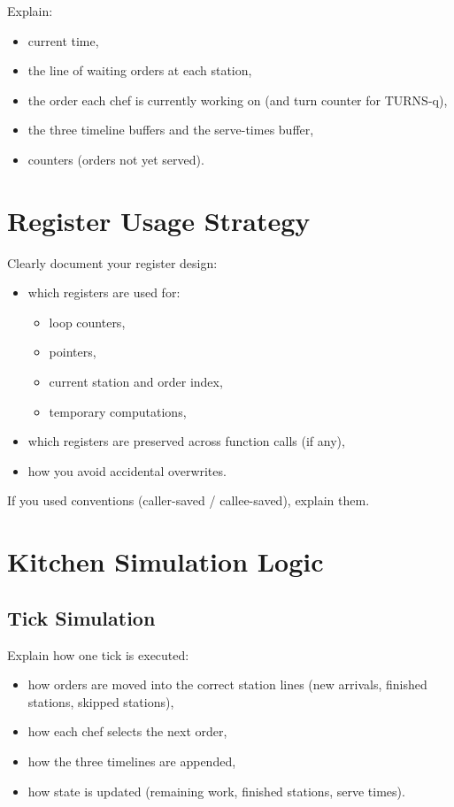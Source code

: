 \documentclass[a4paper,12pt]{article}
\begin{document}
Explain:
\begin{itemize}
\item current time,
\item the line of waiting orders at each station,
\item the order each chef is currently working on (and turn counter for TURNS-q),
\item the three timeline buffers and the serve-times buffer,
\item counters (orders not yet served).
\end{itemize}


\section{Register Usage Strategy}

Clearly document your register design:

\begin{itemize}
\item which registers are used for:
    \begin{itemize}
    \item loop counters,
    \item pointers,
    \item current station and order index,
    \item temporary computations,
    \end{itemize}
\item which registers are preserved across function calls (if any),
\item how you avoid accidental overwrites.
\end{itemize}

If you used conventions (caller-saved / callee-saved), explain them.

\section{Kitchen Simulation Logic}

\subsection{Tick Simulation}

Explain how one tick is executed:

\begin{itemize}
\item how orders are moved into the correct station lines (new arrivals, finished stations, skipped stations),
\item how each chef selects the next order,
\item how the three timelines are appended,
\item how state is updated (remaining work, finished stations, serve times).
\end{itemize}
\end{document}
